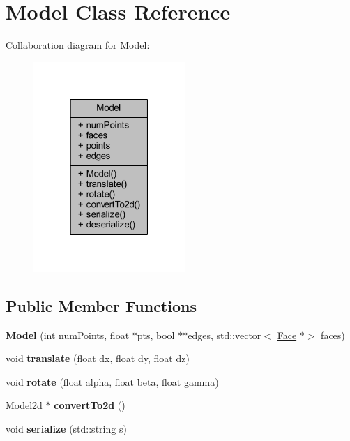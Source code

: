 \hypertarget{class_model}{}\section{Model Class Reference}
\label{class_model}


Collaboration diagram for Model\+:
\nopagebreak
\begin{figure}[H]
\begin{center}
\leavevmode
\includegraphics[width=163pt]{class_model__coll__graph}
\end{center}
\end{figure}
\subsection*{Public Member Functions}
\begin{DoxyCompactItemize}
\item 
\mbox{\label{class_model_a39cf79e51da0f52f1031f98f1bebd118}} 
{\bfseries Model} (int num\+Points, float $\ast$pts, bool $\ast$$\ast$edges, std\+::vector$<$ \mbox{\hyperlink{class_face}{Face}} $\ast$$>$ faces)
\item 
\mbox{\label{class_model_a32e61c8487a2202e9f3f041a8abcb3c2}} 
void {\bfseries translate} (float dx, float dy, float dz)
\item 
\mbox{\label{class_model_ae5999fb77646320aed8d81a669568caa}} 
void {\bfseries rotate} (float alpha, float beta, float gamma)
\item 
\mbox{\label{class_model_ac62fb1874a6597955c89fe3a9a1663e1}} 
\mbox{\hyperlink{class_model2d}{Model2d}} $\ast$ {\bfseries convert\+To2d} ()
\item 
\mbox{\label{class_model_abc71b3488f7f944f1c99727a491ee985}} 
void {\bfseries serialize} (std\+::string s)
\end{DoxyCompactItemize}
